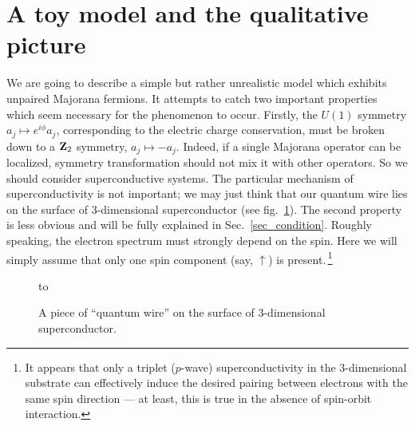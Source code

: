 \section{A toy model and the qualitative picture} \label{sec_model}

We are going to describe a simple but rather unrealistic model which exhibits
unpaired Majorana fermions. It attempts to catch two important properties
which seem necessary for the phenomenon to occur. Firstly, the $U(1)$ symmetry
$a_j\mapsto e^{i\phi}a_j$, corresponding to the electric charge conservation,
must be broken down to a ${\bf Z}_2$ symmetry, $a_j\mapsto -a_j$. Indeed, if a
single Majorana operator can be localized, symmetry transformation should not
mix it with other operators. So we should consider superconductive systems.
The particular mechanism of superconductivity is not important; we may just
think that our quantum wire lies on the surface of 3-dimensional
superconductor (see fig.~\ref{fig_layout}). The second property is less
obvious and will be fully explained in Sec.~\ref{sec_condition}. Roughly
speaking, the electron spectrum must strongly depend on the spin. Here we will
simply assume that only one spin component (say, $\uparrow$) is
present.\,\footnote{\label{remark_triplet} It appears that only a triplet
($p$-wave) superconductivity in the 3-dimensional substrate can effectively
induce the desired pairing between electrons with the same spin direction ---
at least, this is true in the absence of spin-orbit interaction.}

\begin{figure}[ht]
\hbox to 
\caption{A piece of ``quantum wire'' on the surface of 3-dimensional
superconductor.}
\label{fig_layout}
\end{figure}

